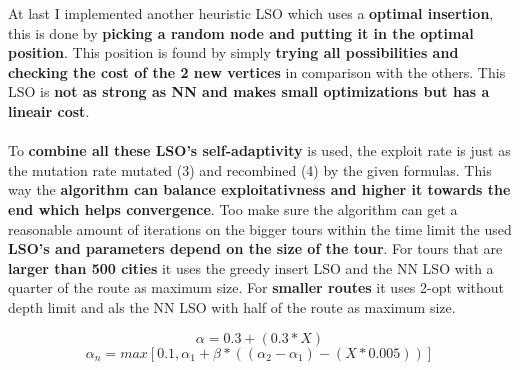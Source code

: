 \documentclass[a4paper,10pt]{article}
\begin{document}
At last I implemented another heuristic LSO which uses a \textbf{optimal insertion}, this is done by \textbf{picking a random node and putting it in the optimal position}. This  position is found by simply \textbf{trying all possibilities and checking the cost of the 2 new vertices} in comparison with the others. This LSO is \textbf{not as strong as NN and makes small optimizations but has a lineair cost}.
\\\\
To \textbf{combine all these LSO's self-adaptivity} is used, the exploit rate is just as the mutation rate mutated (3) and recombined (4) by the given formulas. This way the \textbf{algorithm can balance exploitativness and higher it towards the end which helps convergence}. Too make sure the algorithm can get a reasonable amount of iterations on the bigger tours within the time limit the used \textbf{LSO's and parameters depend on the size of the tour}. For tours that are \textbf{larger than 500 cities} it uses the greedy insert LSO and the NN LSO with a quarter of the route as maximum size. For \textbf{smaller routes} it uses 2-opt without depth limit and als the NN LSO with half of the route as maximum size.

\begin{equation}
	\alpha = 0.3 + (0.3 * X)
\end{equation}
\begin{equation}
	\alpha_n = max[0.1, \alpha_1 + \beta * ((\alpha_2 - \alpha_1) - (X*0.005))]
\end{equation}
\end{document}
